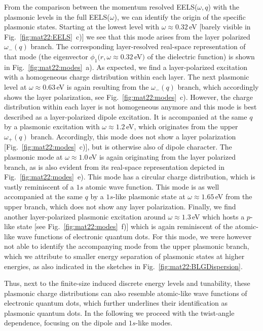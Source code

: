 From the comparison between the momentum resolved EELS($\omega,q$) with the plasmonic levels in the full EELS($\omega$), we can identify the origin of the specific plasmonic states. Starting at the lowest level with $\omega \approx 0.32\,$eV [barely visible in Fig.~\ref{fig:mat22:EELS}~c)] we see that this mode arises from the layer polarized $\omega_-(q)$ branch. %
The corresponding layer-resolved real-space representation of that mode (the eigenvector $\phi_1(r, \omega\approx 0.32\,$eV$)$ of the dielectric function) is shown in Fig.~\ref{fig:mat22:modes}~a). As expected, we find a layer-polarized excitation with a homogeneous charge distribution within each layer.  The next plasmonic level at $\omega \approx 0.63\,$eV is again resulting from the $\omega_-(q)$ branch, which accordingly shows the layer polarization, see Fig.~\ref{fig:mat22:modes}~c). However, the charge distribution within each layer is not homogeneous anymore and this mode is best described as a layer-polarized dipole excitation. It is accompanied at the same $q$ by a plasmonic excitation with $\omega \approx 1.2\,$eV, which originates from the upper $\omega_+(q)$ branch.
Accordingly, this mode does not show a layer polarization [Fig.~\ref{fig:mat22:modes}~c)], but is otherwise also of dipole character. The plasmonic mode at $\omega \approx 1.0\,$eV is again originating from the layer polarized branch, as is also evident from its real-space representation depicted in Fig.~\ref{fig:mat22:modes}~e). This mode has a circular charge distribution, which is vastly reminiscent of a $1s$ atomic wave function. This mode is as well accompanied at the same $q$ by a $1s$-like plasmonic state at $\omega \approx 1.65\,$eV from the upper branch,%
which does not show any layer polarization. Finally, we find another layer-polarized plasmonic excitation around $\omega \approx 1.3\,$eV which hosts a $p$-like state [see Fig.~\ref{fig:mat22:modes}~f)] which is again reminiscent of the atomic-like wave functions of electronic quantum dots. For this mode, we were however not able to identify the accompanying mode from the upper plasmonic branch, which we attribute to smaller energy separation of plasmonic states at higher energies, as also indicated in the sketches in Fig.~\ref{fig:mat22:BLGDispersion}.

Thus, next to the finite-size induced discrete energy levels and tunability, these plasmonic charge distributions can also resemble atomic-like wave functions of electronic quantum dots, which further underlines their identification as plasmonic quantum dots. In the following we proceed with the twist-angle dependence, focusing on the dipole and $1s$-like modes.

